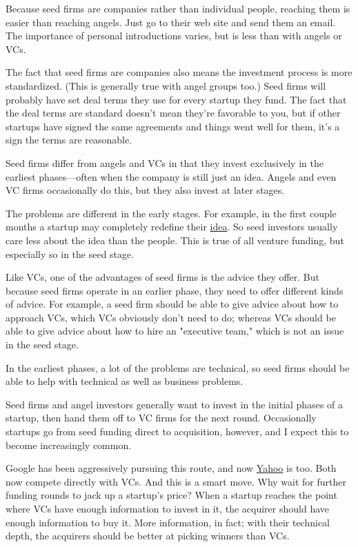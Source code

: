 Because seed firms are companies rather than individual people,
reaching them is easier than reaching angels.  Just go to their web
site and send them an email.  The importance of personal introductions
varies, but is less than with angels or VCs.

The fact that seed firms are companies also means the investment
process is more standardized.  (This is generally true with angel
groups too.) Seed firms will probably have set deal terms they use
for every startup they fund.  The fact that the deal terms are
standard doesn't mean they're favorable to you, but if other startups
have signed the same agreements and things went well for them, it's
a sign the terms are reasonable.

Seed firms differ from angels and VCs in that they invest exclusively
in the earliest phases---often when the company is still just an
idea.  Angels and even VC firms occasionally do this, but they also
invest at later stages.

The problems are different in the early stages.  For example, in
the first couple months a startup may completely redefine their \href{http://www.paulgraham.com/ideas.html}{idea}.  So seed investors usually care less
about the idea than the people. This is true of all venture funding,
but especially so in the seed stage.

Like VCs, one of the advantages of seed firms is the advice they
offer.  But because seed firms operate in an earlier phase, they
need to offer different kinds of advice.  For example, a seed firm
should be able to give advice about how to approach VCs, which VCs
obviously don't need to do; whereas VCs should be able to give
advice about how to hire an "executive team," which is not an issue
in the seed stage.

In the earliest phases, a lot of the problems are technical, so
seed firms should be able to help with technical as well as business
problems.

Seed firms and angel investors generally want to invest in the
initial phases of a startup, then hand them off to VC firms for the
next round.  Occasionally startups go from seed funding direct to
acquisition, however, and I expect this to become increasingly
common.

Google has been aggressively pursuing this route, and now \href{http://ycombinator.com/buckman.html}{Yahoo} is too.  Both
now compete directly with VCs.  And this is a smart move.  Why wait
for further funding rounds to jack up a startup's price?  When a
startup reaches the point where VCs have enough information to
invest in it, the acquirer should have enough information to buy
it.  More information, in fact; with their technical depth, the
acquirers should be better at picking winners than VCs.

